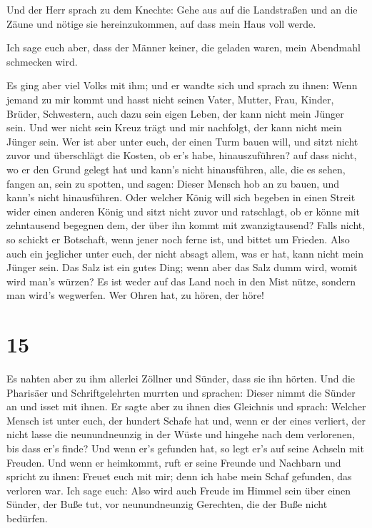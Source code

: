  Und der Herr sprach zu dem Knechte: Gehe aus auf die
Landstraßen und an die Zäune und nötige sie hereinzukommen, auf dass
mein Haus voll werde.

 Ich sage euch aber, dass der Männer keiner, die geladen
waren, mein Abendmahl schmecken wird.

 Es ging aber viel Volks mit ihm; und er wandte sich und
sprach zu ihnen:  Wenn jemand zu mir kommt und hasst
nicht seinen Vater, Mutter, Frau, Kinder, Brüder, Schwestern, auch dazu
sein eigen Leben, der kann nicht mein Jünger sein.  Und
wer nicht sein Kreuz trägt und mir nachfolgt, der kann nicht mein Jünger
sein.  Wer ist aber unter euch, der einen Turm bauen
will, und sitzt nicht zuvor und überschlägt die Kosten, ob er's habe,
hinauszuführen?  auf dass nicht, wo er den Grund gelegt
hat und kann's nicht hinausführen, alle, die es sehen, fangen an, sein
zu spotten,  und sagen: Dieser Mensch hob an zu bauen,
und kann's nicht hinausführen.  Oder welcher König will
sich begeben in einen Streit wider einen anderen König und sitzt nicht
zuvor und ratschlagt, ob er könne mit zehntausend begegnen dem, der über
ihn kommt mit zwanzigtausend?  Falls nicht, so schickt er
Botschaft, wenn jener noch ferne ist, und bittet um Frieden.
 Also auch ein jeglicher unter euch, der nicht absagt
allem, was er hat, kann nicht mein Jünger sein.  Das Salz
ist ein gutes Ding; wenn aber das Salz dumm wird, womit wird man's
würzen?  Es ist weder auf das Land noch in den Mist
nütze, sondern man wird's wegwerfen. Wer Ohren hat, zu hören, der höre!

\hypertarget{section-14}{%
\section{15}\label{section-14}}

 Es nahten aber zu ihm allerlei Zöllner und Sünder, dass
sie ihn hörten.  Und die Pharisäer und Schriftgelehrten
murrten und sprachen: Dieser nimmt die Sünder an und isset mit ihnen.
 Er sagte aber zu ihnen dies Gleichnis und sprach:
 Welcher Mensch ist unter euch, der hundert Schafe hat
und, wenn er der eines verliert, der nicht lasse die neunundneunzig in
der Wüste und hingehe nach dem verlorenen, bis dass er's finde?
 Und wenn er's gefunden hat, so legt er's auf seine
Achseln mit Freuden.  Und wenn er heimkommt, ruft er seine
Freunde und Nachbarn und spricht zu ihnen: Freuet euch mit mir; denn ich
habe mein Schaf gefunden, das verloren war.  Ich sage
euch: Also wird auch Freude im Himmel sein über einen Sünder, der Buße
tut, vor neunundneunzig Gerechten, die der Buße nicht bedürfen.

